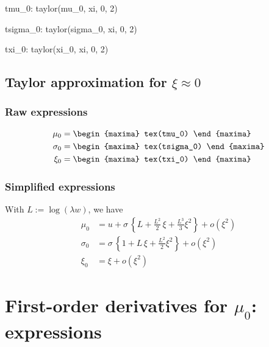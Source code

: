 {\footnotesize
\begin{maxima}
  tmu_0: taylor(mu_0, xi, 0, 2)
\end{maxima}
\begin{maxima}
  tsigma_0: taylor(sigma_0, xi, 0, 2)
\end{maxima}
\begin{maxima}
  txi_0: taylor(xi_0, xi, 0, 2)
\end{maxima}
}

\subsection{Taylor approximation for $\xi \approx 0$}

\subsubsection*{Raw expressions}

{\color{MonVertF}
\begin{align*}
\mu_0 &= 
\begin{maxima}
  tex(tmu_0)
\end{maxima} \\
\sigma_0 &= 
\begin{maxima}
  tex(tsigma_0)
\end{maxima}\\
  \xi_0 &= 
\begin{maxima}
  tex(txi_0)
\end{maxima}
\end{align*}
}

\subsubsection*{Simplified expressions}
With $L:= \log(\lambda w)$, we have
{\color{red}
\begin{align*}
  \mu_0 &= u + \sigma \, \left\{ L + \frac{L^2}{2} \,\xi + \frac{L^3}{3}\xi^2 \right\} + o(\xi^2) \\
  \sigma_0 &= \sigma \,  \left\{ 1 + L \,\xi + \frac{L^2}{2}\xi^2 \right\} + o(\xi^2) \\
  \xi_0 &= \xi + o(\xi^2)
\end{align*}
}


\section{First-order derivatives for $\mu_0$: expressions}


